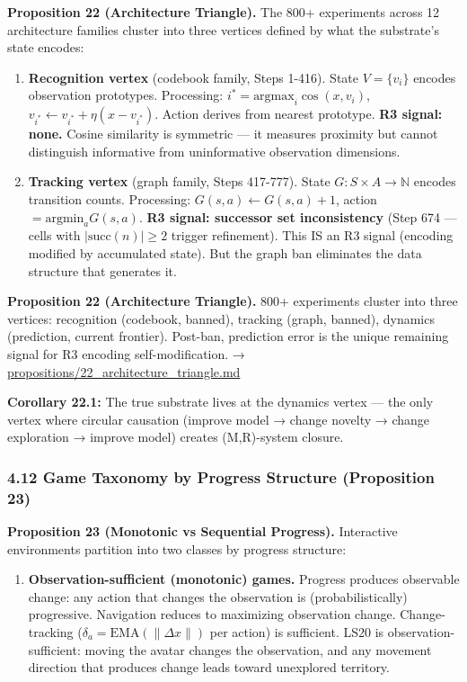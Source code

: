 \documentclass[
  11pt,
]{article}
\newcounter{none} %
\providecommand{\tightlist}{%
  \setlength{\itemsep}{0pt}\setlength{\parskip}{0pt}}
\begin{document}
\textbf{Proposition 22 (Architecture Triangle).} The 800+ experiments
across 12 architecture families cluster into three vertices defined by
what the substrate's state encodes:

\begin{enumerate}
\def\labelenumi{\arabic{enumi}.}
\item
  \textbf{Recognition vertex} (codebook family, Steps 1-416). State
  \(V = \{v_i\}\) encodes observation prototypes. Processing:
  \(i^* = \text{argmax}_i \cos(x, v_i)\),
  \(v_{i^*} \leftarrow v_{i^*} + \eta(x - v_{i^*})\). Action derives
  from nearest prototype. \textbf{R3 signal: none.} Cosine similarity is
  symmetric --- it measures proximity but cannot distinguish informative
  from uninformative observation dimensions.
\item
  \textbf{Tracking vertex} (graph family, Steps 417-777). State
  \(G: S \times A \to \mathbb{N}\) encodes transition counts.
  Processing: \(G(s, a) \leftarrow G(s, a) + 1\), action
  \(= \text{argmin}_a G(s, a)\). \textbf{R3 signal: successor set
  inconsistency} (Step 674 --- cells with \(|\text{succ}(n)| \geq 2\)
  trigger refinement). This IS an R3 signal (encoding modified by
  accumulated state). But the graph ban eliminates the data structure
  that generates it.
\end{enumerate}

\textbf{Proposition 22 (Architecture Triangle).} 800+ experiments
cluster into three vertices: recognition (codebook, banned), tracking
(graph, banned), dynamics (prediction, current frontier). Post-ban,
prediction error is the unique remaining signal for R3 encoding
self-modification. → \url{propositions/22_architecture_triangle.md}

\textbf{Corollary 22.1:} The true substrate lives at the dynamics vertex
--- the only vertex where circular causation (improve model → change
novelty → change exploration → improve model) creates (M,R)-system
closure.

\subsubsection{4.12 Game Taxonomy by Progress Structure (Proposition
23)}\label{game-taxonomy-by-progress-structure-proposition-23}

\textbf{Proposition 23 (Monotonic vs Sequential Progress).} Interactive
environments partition into two classes by progress structure:

\begin{enumerate}
\def\labelenumi{(\alph{enumi})}
\tightlist
\item
  \textbf{Observation-sufficient (monotonic) games.} Progress produces
  observable change: any action that changes the observation is
  (probabilistically) progressive. Navigation reduces to maximizing
  observation change. Change-tracking
  (\(\delta_a = \text{EMA}(\|\Delta x\|)\) per action) is sufficient.
  LS20 is observation-sufficient: moving the avatar changes the
  observation, and any movement direction that produces change leads
  toward unexplored territory.
\end{enumerate}
\end{document}
